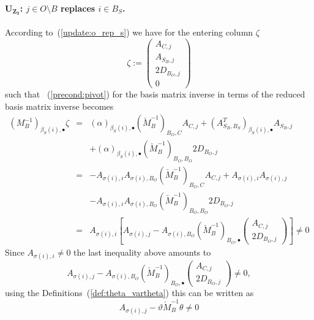 \documentclass[a4paper]{article}
\begin{document}
\paragraph{$\mathbf{U_{Z_{3}}}$: $j \in O \setminus B$ replaces $i \in B_{S}$.}
According to~(\ref{update:o_rep_s})
we have for the entering column $\zeta$
\begin{equation}
\zeta:=
\left(
\begin{array}{c}
A_{C, j} \\
\hline
A_{S_{B},j} \\
\hline
2D_{B_{O},j} \\
\hline
0
\end{array}
\right)
\end{equation}
such that ~(\ref{precond:pivot})
for the basis matrix inverse in terms of
the reduced basis matrix inverse becomes
\begin{eqnarray}
\left(M_{B}^{-1}\right)_{\beta_{S}(i), \bullet} \zeta
&=&
\left(\alpha\right)_{\beta_{S}(i), \bullet}
\left(\check{M}_{B}^{-1}\right)_{B_{O},C}A_{C,j}
+\left(A_{S_{B}, B_{S}}^{T}\right)_{\beta_{S}(i), \bullet}A_{S_{B},j}
\nonumber \\
&&
+\left(\alpha\right)_{\beta_{S}(i), \bullet}
 \left(\check{M}_{B}^{-1}\right)_{B_{O}, B_{O}}2D_{B_{O},j}
\nonumber \\
&=&
-A_{\sigma(i),i}A_{\sigma(i),B_{O}}
 \left(\check{M}_{B}^{-1}\right)_{B_{O},C}A_{C,j}
+A_{\sigma(i),i}A_{\sigma(i),j}
\nonumber \\
&&
-A_{\sigma(i),i}A_{\sigma(i),B_{O}}
 \left(\check{M}_{B}^{-1}\right)_{B_{O},B_{O}}2D_{B_{O},j}
\nonumber \\
&=&
A_{\sigma(i),i}
\left[
A_{\sigma(i),j} - A_{\sigma(i), B_{O}}
\left(\check{M}_{B}^{-1}\right)_{B_{O}, \bullet}
\left(
\begin{array}{c}
A_{C,j}  \\
\hline
2D_{B_{O}, j}
\end{array}
\right)
\right]
\neq 0
\nonumber
\end{eqnarray}
Since $A_{\sigma(i), i} \neq 0$ the last inequality above amounts to
\begin{equation}
A_{\sigma(i),j} - A_{\sigma(i), B_{O}}
\left(\check{M}_{B}^{-1}\right)_{B_{O}, \bullet}
\left(
\begin{array}{c}
A_{C,j}  \\
\hline
2D_{B_{O}, j}
\end{array}
\right)
\neq
0,
\nonumber
\end{equation}
using the Definitions~(\ref{def:theta_vartheta}) this can be written as
\begin{equation}
A_{\sigma(i),j} -
\vartheta\check{M}_{B}^{-1}\theta \neq 0
\end{equation}
\end{document}
